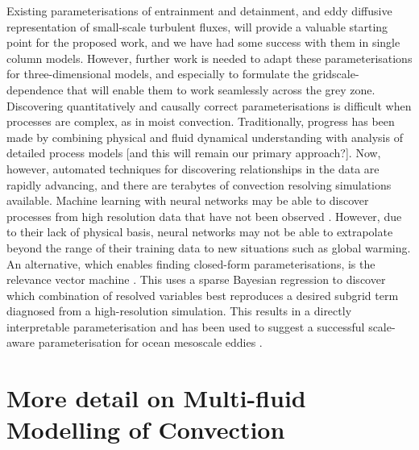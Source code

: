 \documentclass[11pt,a4paper]{article}
\begin{document}
Existing parameterisations of entrainment and detainment, and eddy diffusive representation of small-scale turbulent
fluxes, will provide a valuable starting point for the proposed work, and we have had some success with them in
single column models. However, further work is needed to adapt these parameterisations for three-dimensional models,
and especially to formulate the gridscale-dependence that will enable them to work seamlessly across the grey zone.
Discovering quantitatively and causally correct parameterisations is difficult when processes are complex, as in moist convection. Traditionally, progress has been made by combining physical and fluid dynamical understanding with
analysis of detailed process models [and this will remain our primary approach?]. Now, however, 
automated techniques for discovering relationships in the data are rapidly advancing, and 
there are terabytes of convection resolving simulations available. Machine learning with neural networks may be able to discover processes from high resolution data that have not been observed \cite[e.g.][]{ogorman2018}. However, due to their lack of physical basis, neural networks may not be able to extrapolate beyond the range of their training data to new situations such as global warming. An alternative, which enables finding closed-form parameterisations, is the relevance vector machine \cite[e.g.][]{tipping2001}. This uses a sparse Bayesian regression to discover which combination of resolved variables best reproduces a desired subgrid term diagnosed from a high-resolution simulation. This results in a directly interpretable parameterisation and has been used to suggest a successful scale-aware parameterisation for ocean mesoscale eddies \cite[]{zanna2020}.


\section{More detail on Multi-fluid Modelling of Convection}
\label{sec:mf}
\end{document}
